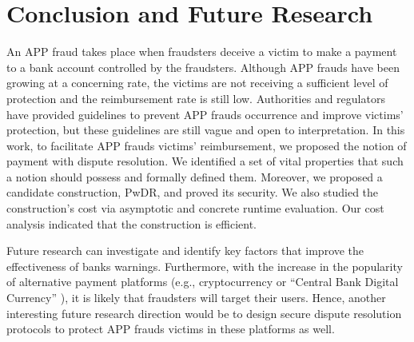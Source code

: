 
 \vspace{-2.8mm}
\section{Conclusion and Future Research}\label{sec::conclusion}


An APP fraud takes place when fraudsters deceive a victim to make a payment to a bank account controlled by the fraudsters. Although APP frauds have been growing at a concerning rate, the victims are not receiving a sufficient level of protection and the reimbursement rate is still low. Authorities and regulators have provided guidelines to prevent APP frauds occurrence and improve victims’ protection, but these guidelines are still vague and open to interpretation. In this work, to facilitate APP frauds victims’ reimbursement,  we proposed the notion of payment with dispute resolution. We identified a set of vital properties that such a notion should possess and formally defined them. Moreover,  we proposed a candidate construction, PwDR, and proved its security.  We also studied the construction's cost via asymptotic and concrete runtime evaluation. Our cost analysis indicated that the construction is efficient. 



Future research can investigate and identify key factors that improve the effectiveness of banks warnings.  Furthermore, with the increase in the popularity of alternative payment platforms (e.g.,  cryptocurrency or ``Central Bank Digital Currency'' \cite{CBDC}), it is likely that fraudsters will target their users. Hence, another interesting future research direction would be to design secure dispute resolution protocols to protect  APP frauds victims in these platforms as well. 



